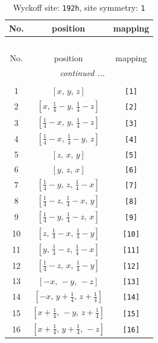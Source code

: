 \documentclass[fleqn,8pt]{jsarticle}
\begin{document}
\begin{longtable}{ccc}
\caption{Wyckoff site: {\tt 192h}, site symmetry: {\tt 1}}
 \\
 \hline \hline
No. & position & mapping \\ \hline \endfirsthead

\multicolumn{2}{l}{\tablename\ \thetable{}} \\
 \hline \hline
No. & position & mapping \\ \hline \endhead

 \hline \hline
\multicolumn{2}{r}{\footnotesize\it continued ...} \\ \endfoot

 \hline \hline
\multicolumn{2}{r}{} \\ \endlastfoot

1 & $\left[ x,\, y,\, z \right]$ & {\tt [1]} \\ \hline
2 & $\left[ x,\, \frac{1}{4} - y,\, \frac{1}{4} - z \right]$ & {\tt [2]} \\ \hline
3 & $\left[ \frac{1}{4} - x,\, y,\, \frac{1}{4} - z \right]$ & {\tt [3]} \\ \hline
4 & $\left[ \frac{1}{4} - x,\, \frac{1}{4} - y,\, z \right]$ & {\tt [4]} \\ \hline
5 & $\left[ z,\, x,\, y \right]$ & {\tt [5]} \\ \hline
6 & $\left[ y,\, z,\, x \right]$ & {\tt [6]} \\ \hline
7 & $\left[ \frac{1}{4} - y,\, z,\, \frac{1}{4} - x \right]$ & {\tt [7]} \\ \hline
8 & $\left[ \frac{1}{4} - z,\, \frac{1}{4} - x,\, y \right]$ & {\tt [8]} \\ \hline
9 & $\left[ \frac{1}{4} - y,\, \frac{1}{4} - z,\, x \right]$ & {\tt [9]} \\ \hline
10 & $\left[ z,\, \frac{1}{4} - x,\, \frac{1}{4} - y \right]$ & {\tt [10]} \\ \hline
11 & $\left[ y,\, \frac{1}{4} - z,\, \frac{1}{4} - x \right]$ & {\tt [11]} \\ \hline
12 & $\left[ \frac{1}{4} - z,\, x,\, \frac{1}{4} - y \right]$ & {\tt [12]} \\ \hline
13 & $\left[ - x,\, - y,\, - z \right]$ & {\tt [13]} \\ \hline
14 & $\left[ - x,\, y + \frac{1}{4},\, z + \frac{1}{4} \right]$ & {\tt [14]} \\ \hline
15 & $\left[ x + \frac{1}{4},\, - y,\, z + \frac{1}{4} \right]$ & {\tt [15]} \\ \hline
16 & $\left[ x + \frac{1}{4},\, y + \frac{1}{4},\, - z \right]$ & {\tt [16]} \\ \hline

\end{longtable}
\end{document}
